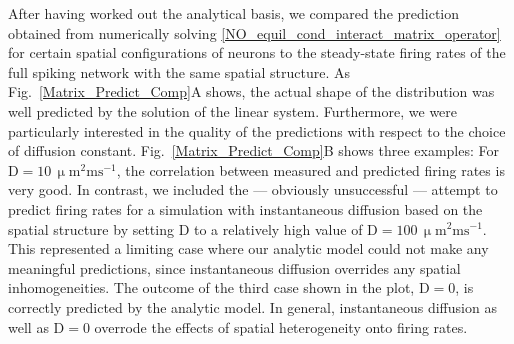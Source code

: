 \documentclass[10pt,letterpaper]{article}
\begin{document}
After having worked out the analytical basis, we compared the prediction obtained from numerically solving \eqref{NO_equil_cond_interact_matrix_operator} for certain spatial configurations of neurons to the steady-state firing rates of the full spiking network with the same spatial structure. As Fig.~\ref{Matrix_Predict_Comp}A shows, the actual shape of the distribution was well predicted by the solution of the linear system. Furthermore, we were particularly interested in the quality of the predictions with respect to the choice of diffusion constant. Fig.~\ref{Matrix_Predict_Comp}B shows three examples: For $\mathrm{D=10\, \upmu m^2 ms^{-1}}$, the correlation between measured and predicted firing rates is very good. In contrast, we included the --- obviously unsuccessful --- attempt to predict firing rates for a simulation with instantaneous diffusion based on the spatial structure by setting D to a relatively high value of $\mathrm{D=100\, \upmu m^2 ms^{-1}}$. This represented a limiting case where our analytic model could not make any meaningful predictions, since instantaneous diffusion overrides any spatial inhomogeneities. The outcome of the third case shown in the plot, $\mathrm{D=0}$, is correctly predicted by the analytic model. In general, instantaneous diffusion as well as $\mathrm{D=0}$ overrode the effects of spatial heterogeneity onto firing rates. 
\end{document}
